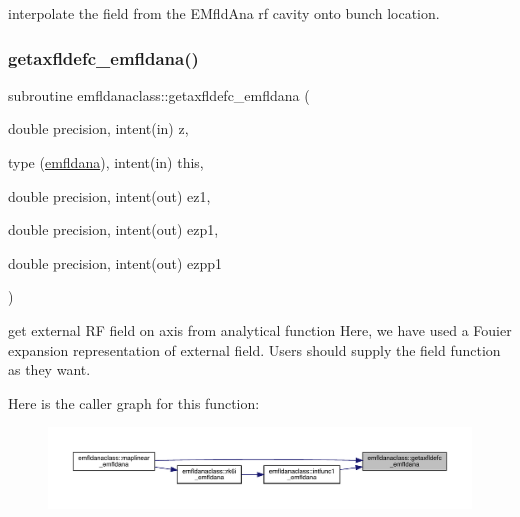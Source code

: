 interpolate the field from the E\+Mfld\+Ana rf cavity onto bunch location. 

\mbox{\label{namespaceemfldanaclass_a458770ca16d15a091232d5067c282f5a}} 
\subsubsection{\texorpdfstring{getaxfldefc\_emfldana()}{getaxfldefc\_emfldana()}}
{\footnotesize\ttfamily subroutine emfldanaclass\+::getaxfldefc\+\_\+emfldana (\begin{DoxyParamCaption}\item[{double precision, intent(in)}]{z,  }\item[{type (\mbox{\hyperlink{namespaceemfldanaclass_structemfldanaclass_1_1emfldana}{emfldana}}), intent(in)}]{this,  }\item[{double precision, intent(out)}]{ez1,  }\item[{double precision, intent(out)}]{ezp1,  }\item[{double precision, intent(out)}]{ezpp1 }\end{DoxyParamCaption})}



get external RF field on axis from analytical function Here, we have used a Fouier expansion representation of external field. Users should supply the field function as they want. 

Here is the caller graph for this function\+:\nopagebreak
\begin{figure}[H]
\begin{center}
\leavevmode
\includegraphics[width=350pt]{namespaceemfldanaclass_a458770ca16d15a091232d5067c282f5a_icgraph}
\end{center}
\end{figure}
\mbox{\label{namespaceemfldanaclass_a3ff336abdafaac7ad874da092e6365ed}} 
